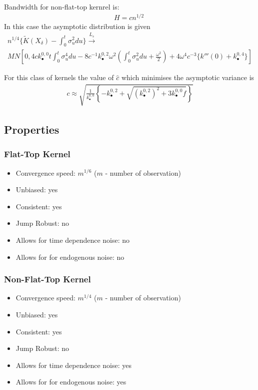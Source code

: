 \documentclass[letterpaper]{report}
\newcounter{N}
\begin{document}
\noindent Bandwidth for non-flat-top kernrel is:
\begin{gather}
H = cn^{1/2}\;
\end{gather}
\noindent In this case the asymptotic distribution is given
\begin{gather}
n^{1/4}\{\tilde{K}(X_\delta) - \int_0^t \sigma_u^2 du\}
\stackrel{L_s}{\to}\nonumber\\
MN\left[0,4c k_{\bullet}^{0,0} t \int_0^t \sigma_u^4 du - 8 c^{-1} k_{\bullet}^{0,2}\omega^2 \left(\int_0^t \sigma_u^2 du + \frac{\omega^2}{2}\right) + 4\omega^4c^{-3}\{k'''(0) + k_{\bullet}^{0,4}\} \right]
\end{gather}

\noindent For this class of kernels the value of $\hat{c}$ which minimises the asymptotic variance is
\begin{gather}
c \approx \sqrt{\frac{1}{k_{\bullet}^{0,0}} \left\{-k_{\bullet}^{0,2} + \sqrt{(k_{\bullet}^{0,2})^2 + 3 k_{\bullet}^{0,0} f} \right\}}
\end{gather}
\subsection{Properties}
\subsubsection{Flat-Top Kernel}
\begin{itemize}
\item Convergence speed: $m^{1/6}$ ($m$ - number of observation)
\item Unbiased: yes
\item Consistent: yes
\item Jump Robust: no
\item Allows for time dependence noise: no
\item Allows for for endogenous noise: no
\end{itemize}
\subsubsection{Non-Flat-Top Kernel}
\begin{itemize}
\item Convergence speed: $m^{1/4}$ ($m$ - number of observation)
\item Unbiased: yes
\item Consistent: yes
\item Jump Robust: no
\item Allows for time dependence noise: yes
\item Allows for for endogenous noise: yes
\end{itemize}
 
\end{document}
